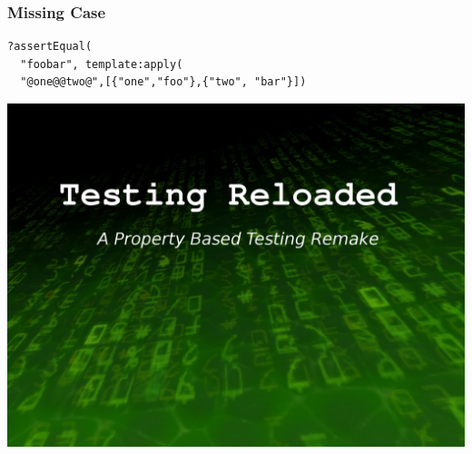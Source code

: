 \documentclass[xcolor=dvipsnames]{beamer}
\begin{document}
\begin{frame}[fragile]
  \frametitle{Missing Case}
\begin{verbatim}
?assertEqual(
  "foobar", template:apply(
  "@one@@two@",[{"one","foo"},{"two", "bar"}])
\end{verbatim}
\end{frame}

\begin{frame}[plain]
  \includegraphics[width=\textwidth]{images/matrix}
\end{frame}
\end{document}
